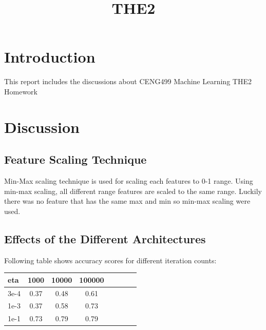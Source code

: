 \documentclass[conference]{IEEEtran}
\begin{document}
\title{THE2\\
}

\author{
}

\maketitle


\section{Introduction}
This report includes the discussions about CENG499 Machine Learning THE2 Homework \\

\section{Discussion}

\subsection{Feature Scaling Technique}

Min-Max scaling technique is used for scaling each  features to 0-1 range. Using min-max scaling, all different range features are scaled to the same range. Luckily there was no feature that has the same max and min so min-max scaling were used.

\subsection{Effects of the Different Architectures}

Following table shows accuracy scores for different iteration counts: \\

\begin{tabular}{l*{6}{c}r}
eta  & 1000 & 10000 & 100000 \\
\hline
3e-4 & 0.37 & 0.48 & 0.61 \\
1e-3 & 0.37 & 0.58 & 0.73 \\
1e-1 & 0.73 & 0.79 & 0.79 \\
\end{tabular} \\
\end{document}
